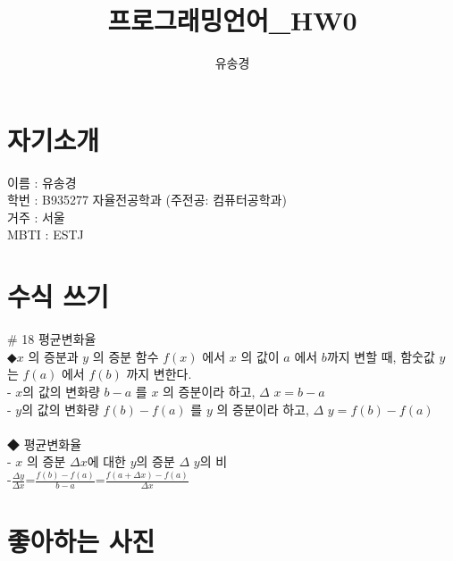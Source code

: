 \documentclass{article}
\title{프로그래밍언어_HW0}
\author{유송경}
\begin{document}
\section{자기소개}
이름 : 유송경 \\
학번 : B935277 자율전공학과 (주전공: 컴퓨터공학과)\\
거주 : 서울 \\
MBTI : ESTJ \\



\section{수식 쓰기}
\# 18 평균변화율 \\
 ◆$x$ 의 증분과 $y$ 의 증분
 함수 $f(x)$ 에서 $x$ 의 값이 $a$ 에서 $b$까지 변할 때, 함숫값 $y$ 는 $f(a)$ 에서 $f(b)$ 까지 변한다. \\
 - $x$의 값의 변화량 $b-a$ 를 $x$ 의 증분이라 하고, $\Delta$ $x=b-a$ \\
 - $y$의 값의 변화량 $f(b)-f(a)$ 를 $y$ 의 증분이라 하고, $\Delta$ $y=f(b)-f(a)$ \\ \\
 ◆ 평균변화율\\
 - $x$ 의 증분 $\Delta$$x$에 대한 $y$의 증분 $\Delta$ $y$의 비 \\
 -$\frac{\Delta y}{\Delta x}$=$\frac{{f(b)-f(a)}}{{b-a}}$=$\frac{{f(a+\Delta x)-f(a)}}{\Delta x}$ \\

\newpage

\section{좋아하는 사진}

\label{sec:sec1}
\end{document}
